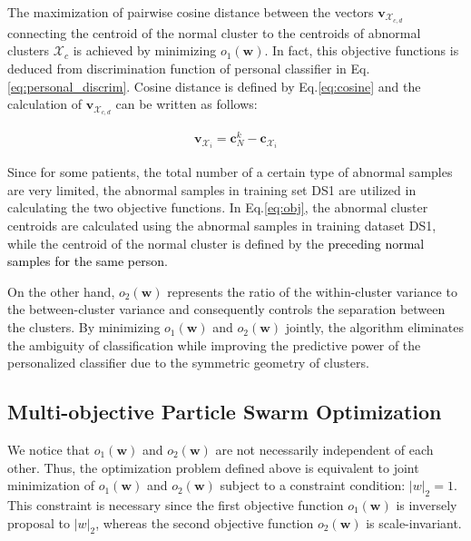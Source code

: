 The maximization of pairwise cosine distance between the vectors $\mathbf{v}_{\mathcal{X}_{c,d}}$ connecting the centroid of the normal cluster to the centroids of abnormal clusters $\mathcal{X}_c$ is achieved by minimizing $o_1(\mathbf{w})$. In fact, this objective functions is deduced from discrimination function of personal classifier in Eq.\ref{eq:personal_discrim}. Cosine distance is defined by Eq.\ref{eq:cosine} and the calculation of $\mathbf{v}_{\mathcal{X}_{c,d}}$ can be written as follows: %

\begin{align}
\mathbf{v}_{\mathcal{X}_i} = \mathbf{c}^k_N -  \mathbf{c}_{\mathcal{X}_i}
\end{align}

Since for some patients, the total number of a certain type of abnormal samples are very limited, the abnormal samples in training set DS1 are utilized in calculating the two objective functions. In Eq.\ref{eq:obj}, the abnormal cluster centroids are calculated using the abnormal samples in training dataset DS1, while the centroid of the normal cluster is defined by the \textcolor{black}{preceding normal samples for the same person}. %

On the other hand, $o_2(\mathbf{w})$ represents the ratio of the within-cluster variance to the between-cluster variance and consequently controls the separation between the clusters. By minimizing $o_1(\mathbf{w})$ and $o_2(\mathbf{w})$ jointly, the algorithm eliminates the ambiguity of classification while %
improving the predictive power of the personalized classifier due to the symmetric geometry of clusters. 

\subsection{Multi-objective Particle Swarm Optimization}

We notice that $o_1(\mathbf{w}) $ and $o_2(\mathbf{w})$ are not necessarily independent of each other. Thus, the optimization problem defined above is equivalent to joint minimization of $o_1(\mathbf{w}) $ and $o_2(\mathbf{w})$ subject to a constraint condition: $|w|_2=1$. This constraint is necessary since the first objective function $o_1(\mathbf{w})$ is inversely proposal to $|w|_2$, whereas the second objective function $o_2(\mathbf{w})$ is scale-invariant. 

